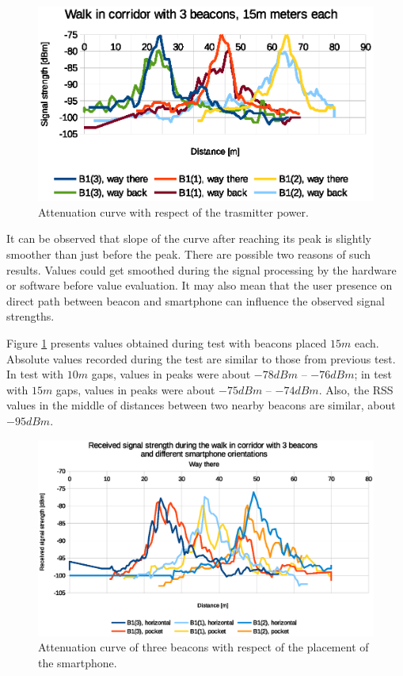 \documentclass[../main.tex]{subfiles}
\begin{document}
\begin{figure}[!htbp]
\includegraphics[width=\textwidth, keepaspectratio]{pictures/tests_case10_walk_15m_raw}
\centering
\caption{Attenuation curve with respect of the trasmitter power.}
\label{fig:tests_case10_walk_15m_raw}
\end{figure}

It can be observed that slope of the curve after reaching its peak is slightly smoother than just before the peak. There are possible two reasons of such results. Values could get smoothed during the signal processing by the hardware or software before value evaluation. It may also mean that the user presence on direct path between beacon and smartphone can influence the observed signal strengths.

Figure \ref{fig:tests_case10_walk_15m_raw} presents values obtained during test with beacons placed $15m$ each. Absolute values recorded during the test are similar to those from previous test. In test with $10m$ gaps, values in peaks were about $-78dBm$ -- $-76dBm$; in test with $15m$ gaps, values in peaks were about $-75dBm$ -- $-74dBm$. Also, the RSS values in the middle of distances between two nearby beacons are similar, about $-95dBm$.

\begin{figure}[!htbp]
\includegraphics[width=\textwidth, keepaspectratio]{pictures/tests_case11_walk_10m_smartphone_orientation}
\centering
\caption{Attenuation curve of three beacons with respect of the placement of the smartphone.}
\label{fig:tests_case11_walk_10m_smartphone_orientation}
\end{figure}
\end{document}
